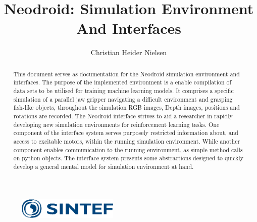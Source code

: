 \documentclass[runningheads,a4paper]{llncs}
\begin{document}
\mainmatter 

\title{Neodroid: Simulation Environment And Interfaces}


\author{Christian Heider Nielsen}



\maketitle

\begin{abstract}
This document serves as documentation for the Neodroid simulation environment and interfaces. The purpose of the implemented environment is a enable compilation of data sets to be utilised for training machine learning models. It comprises a specific simulation of a parallel jaw gripper navigating a difficult environment and grasping fish-like objects, throughout the simulation RGB images, Depth images, positions and rotations are recorded. The Neodroid interface strives to aid a researcher in rapidly developing new simulation environments for reinforcement learning tasks. One component of the interface system serves purposely restricted information about, and access to excitable motors, within the running simulation environment. While another component enables communication to the running environment, as simple method calls on python objects. The interface system presents some abstractions designed to quickly develop a general mental model for simulation environment at hand. 
\end{abstract}

\vspace{\fill}

\begin{figure}
\centering
\includegraphics[height=1cm]{figures/sintef-header}
\end{figure}

\clearpage

\begingroup
\let\clearpage\relax
\tableofcontents
\endgroup

\clearpage












\nocite{*} 

\begin{appendices}
\renewcommand{\thesection}{\Alph{section}}

\end{appendices}
\end{document}
